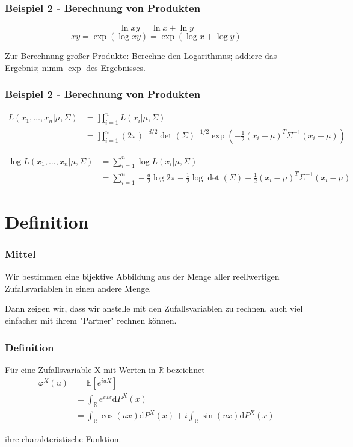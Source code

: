 \documentclass{beamer}
\newcommand{\R}{\mathbb{R}}
\newcommand{\E}{\mathbb{E}}
\newcommand\dint{\mathord{\mathrm{d}}}
\begin{document}
\begin{frame}
\frametitle{Beispiel 2 - Berechnung von Produkten}

$$\ln xy = \ln x + \ln y $$
$$xy = \exp(\log xy) = \exp(\log x + \log y)$$

Zur Berechnung großer Produkte:
Berechne den Logarithmus; addiere das Ergebnis; nimm $\exp$ des Ergebnisses.

\end{frame}

\begin{frame}
\frametitle{Beispiel 2 - Berechnung von Produkten}
{\footnotesize
\begin{align*}
L(x_1, \dots, x_n|\mu, \Sigma) &= \prod_{i = 1}^{n} L(x_i|\mu, \Sigma)\\
&= \prod_{i = 1}^{n} (2 \pi)^{-d/2} \det(\Sigma)^{-1/2} \exp(- \frac{1}{2} (x_i - \mu)^T \Sigma^{-1} (x_i - \mu))
\end{align*}

\begin{align*}
\log L(x_1, \dots, x_n|\mu, \Sigma) &= \sum_{i = 1}^{n} \log L(x_i|\mu, \Sigma)\\
&= \sum_{i = 1}^{n} -\frac{d}{2} \log 2\pi -\frac{1}{2} \log \det(\Sigma) - \frac{1}{2} (x_i - \mu)^T \Sigma^{-1} (x_i - \mu)
\end{align*}

}%


\end{frame}

\section{Definition}

\begin{frame}
\frametitle{Mittel}
Wir bestimmen eine bijektive Abbildung aus der Menge aller reellwertigen Zufallsvariablen in einen andere Menge.

Dann zeigen wir, dass wir anstelle mit den Zufallsvariablen zu rechnen, auch viel einfacher mit ihrem "Partner" rechnen können.
\end{frame}

\begin{frame}
\frametitle{Definition}
Für eine Zufallsvariable X mit Werten in $\R$ bezeichnet
\begin{align} \label{eq1}
\varphi^X(u) &= \E[e^{iuX}] \\
 & = \int_{\R} e^{iux} \dint P^X(x)\\
 & = \int_{\R} \cos(ux) \dint P^X(x) + i \int_{\R} \sin(ux) \dint P^X(x)
\end{align}

ihre charakteristische Funktion.

\end{frame}
\end{document}
